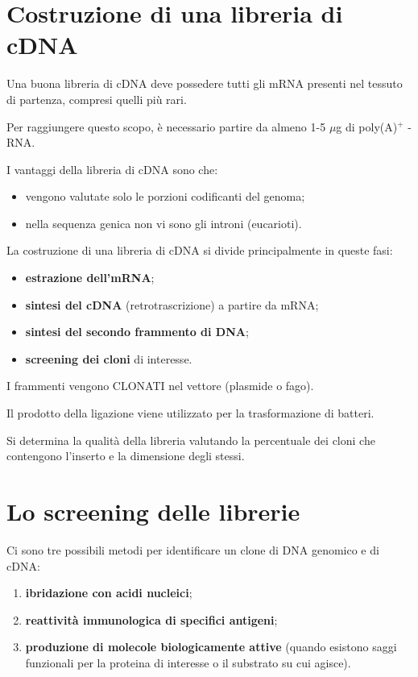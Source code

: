 \documentclass[11pt]{book}
\begin{document}
\section{Costruzione di una libreria di
cDNA}\label{costruzione-di-una-libreria-di-cdna}

Una buona libreria di cDNA deve possedere tutti gli mRNA presenti nel
tessuto di partenza, compresi quelli più rari.

Per raggiungere questo scopo, è necessario partire da almeno 1-5
\(\mu\)g di poly(A)\(^+\) -RNA.

I vantaggi della libreria di cDNA sono che:

\begin{itemize}
\itemsep1pt\parskip0pt
\item
  vengono valutate solo le porzioni codificanti del genoma;
\item
  nella sequenza genica non vi sono gli introni (eucarioti).
\end{itemize}

La costruzione di una libreria di cDNA si divide principalmente in
queste fasi:

\begin{itemize}
\itemsep1pt\parskip0pt
\item
  \textbf{estrazione dell'mRNA};
\item
  \textbf{sintesi del cDNA} (retrotrascrizione) a partire da mRNA;
\item
  \textbf{sintesi del secondo frammento di DNA};
\item
  \textbf{screening dei cloni} di interesse.
\end{itemize}

I frammenti vengono CLONATI nel vettore (plasmide o fago).

Il prodotto della ligazione viene utilizzato per la trasformazione di
batteri.

Si determina la qualità della libreria valutando la percentuale dei
cloni che contengono l'inserto e la dimensione degli stessi.

\section{Lo screening delle
librerie}\label{lo-screening-delle-librerie}

Ci sono tre possibili metodi per identificare un clone di DNA genomico e
di cDNA:

\begin{enumerate}
\def\labelenumi{\arabic{enumi}.}
\itemsep1pt\parskip0pt
\item
  \textbf{ibridazione con acidi nucleici};
\item
  \textbf{reattività immunologica di specifici antigeni};
\item
  \textbf{produzione di molecole biologicamente attive} (quando esistono
  saggi funzionali per la proteina di interesse o il substrato su cui
  agisce).
\end{enumerate}
\end{document}
